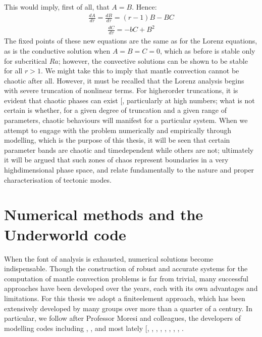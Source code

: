 \documentclass[letterpaper,10pt,english]{jupyterBook}
\begin{document}
\sphinxAtStartPar
This would imply, first of all, that \(A=B\). Hence:
\begin{equation*}
\begin{split} \frac{d A}{d \tau} = \frac{d B}{d \tau} = \left( r - 1 \right) B - BC \end{split}
\end{equation*}\begin{equation*}
\begin{split} \frac{d C}{d \tau} = -bC + B^2 \end{split}
\end{equation*}
\sphinxAtStartPar
The fixed points of these new equations are the same as for the Lorenz equations, as is the conductive solution when \(A=B=C=0\), which as before is stable only for subcritical \(Ra\); however, the convective solutions can be shown to be stable for all \(r>1\). We might take this to imply that mantle convection cannot be chaotic after all. However, it must be recalled that the Lorenz analysis begins with severe truncation of non\sphinxhyphen{}linear terms. For higher\sphinxhyphen{}order truncations, it is evident that chaotic phases can exist {[}\sphinxcite{references:id89}{]}, particularly at high  numbers; what is not certain is whether, for a given degree of truncation and a given range of parameters, chaotic behaviours will manifest for a particular system. When we attempt to engage with the problem numerically and empirically through modelling, which is the purpose of this thesis, it will be seen that certain parameter bands are chaotic and time\sphinxhyphen{}dependent while others are not; ultimately it will be argued that such zones of chaos represent boundaries in a very high\sphinxhyphen{}dimensional phase space, and relate fundamentally to the nature and proper characterisation of tectonic modes.


\section{Numerical methods and the Underworld code}
\label{\detokenize{content/chapter_02_methods/section2:numerical-methods-and-the-underworld-code}}\label{\detokenize{content/chapter_02_methods/section2::doc}}
\sphinxAtStartPar
When the font of analysis is exhausted, numerical solutions become indispensable. Though the construction of robust and accurate systems for the computation of mantle convection problems is far from trivial, many successful approaches have been developed over the years, each with its own advantages and limitations. For this thesis we adopt a finite\sphinxhyphen{}element approach, which has been extensively developed by many groups over more than a quarter of a century. In particular, we follow after Professor Moresi and colleagues, the developers of modelling codes including , , and most lately  {[}, , , , , , , , \sphinxcite{references:id385}{]}.
\end{document}
